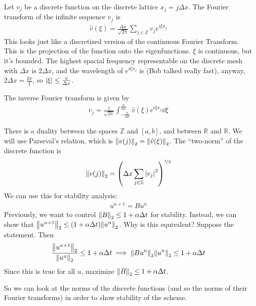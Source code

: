 \documentclass{article}
\newcommand{\Rl}{\mathbb{R}}
\newcommand{\Dx}{\Delta x}
\newcommand{\Dt}{\Delta t}
\begin{document}
            Let $v_j$ be a discrete function on the discrete lattice $x_j = j\Dx$.  The Fourier transform of the infinite sequence $v_j$ is
            \begin{align*}
                \hat{v}(\xi) = \frac{\Dx}{\sqrt{2\pi}}\sum_{j\in\mathbb{Z}}v_j e^{i\xi x_j}
            \end{align*}
            This looks just like a discretized version of the continuous Fourier Transform.  This is the projection of the function onto the eigenfunctions.  $\xi$ is continuous, but it's bounded.  The highest spacial frequency representable on the discrete mesh with $\Dx$ is $2\Dx$, and the wavelength of $e^{i\xi x_j}$ is (Bob talked really fast), anyway, $2\Dx = \frac{2\pi}{\xi}$, so $\abs{\xi} \leq \frac{\pi}{\Dx}$.

            The inverse Fourier transform is given by
            \begin{align*}
                v_j = \frac{1}{\sqrt{2\pi}}\int_{-\frac{\pi}{\Dx}}^{\frac{\pi}{\Dx}} \hat{v}(\xi)e^{i\xi x_j}\dd\xi
            \end{align*}

            There is a duality between the spaces $\mathbb{Z}$ and $[a,b]$, and between $\Rl$ and $\Rl$.  We will use Parseval's relation, which is $\norm{v(j)}_2 = \norm{\hat{v}(\xi)}_2$.  The ``two-norm'' of the discrete function is
            \begin{align*}
                \norm{v(j)}_2 = \qty(\Dx\sum_{j\in\mathbb{Z}}\abs{v_j}^2)^{\nicefrac{1}{2}}
            \end{align*}
            We can use this for stability analysis:
            \begin{align*}
                u^{n+1} = Bu^n
            \end{align*}
            Previously, we want to control $\norm{B}_2 \leq 1 + \alpha\Dt$ for stability.  Instead, we can show that $\norm{u^{n+1}}_2 \leq \qty(1 + \alpha\Dt)\norm{u^n}_2$.  Why is this equivalent?  Suppose the statement.  Then
            \begin{align*}
                \frac{\norm{u^{n+1}}_2}{\norm{u^n}_2} \leq 1 + \alpha\Dt \implies {\norm{Bu^n}_2}{\norm{u^n}_2} \leq 1 + \alpha\Dt
            \end{align*}
            Since this is true for all $u$, maximize $\norm{B}_2 \leq 1 + \alpha\Dt$.

            So we can look at the norms of the discrete functions (and so the norms of their Fourier transforms) in order to show stability of the scheme.
\end{document}
